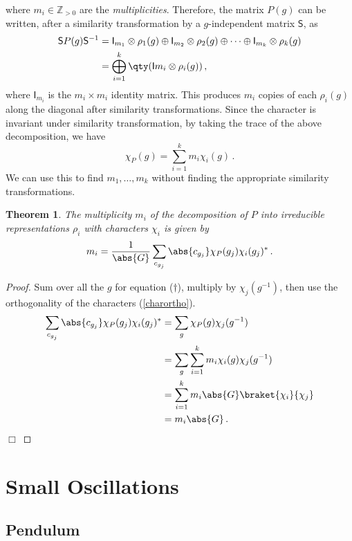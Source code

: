 \documentclass{article}
\theoremstyle{plain}\theoremheaderfont{\normalfont\itshape}\theorembodyfont{\rmfamily}\theoremseparator{.}\newtheorem*{rem}{Remark}\newtheorem*{ex}{Example}\newtheorem*{proof}{Proof}\newtheorem*{altp}{Alternative proof}
\theoremstyle{plain}\theoremheaderfont{\normalfont\bfseries}\theorembodyfont{\rmfamily}\theoremseparator{.}\newtheorem{thm}{Theorem}[section]\newtheorem{lem}[thm]{Lemma}\newtheorem{prop}[thm]{Proposition}\newtheorem*{cor}{Corollary}\newtheorem{defn}[thm]{Definition}\newtheorem{clm}[thm]{Claim}\newtheorem{clminproof}{Claim}
\theoremstyle{break}\theoremheaderfont{\normalfont\itshape}\theorembodyfont{\rmfamily}\theoremseparator{.\medskip}\newtheorem*{proofskip}{Proof}\newtheorem*{exs}{Examples}\newtheorem*{rems}{Remarks}
\theoremstyle{break}\theoremheaderfont{\normalfont\bfseries}\theorembodyfont{\rmfamily}\theoremseparator{.\medskip}\newtheorem{lemskip}[thm]{Lemma}\newtheorem{defnskip}[thm]{Definition}\newtheorem{propskip}[thm]{Proposition}\newtheorem{thmskip}[thm]{Theorem}
\numberwithin{equation}{section}
\newcommand{\qed}{\hfill\ensuremath{\Box}}
\begin{document}
	where \(m_i\in \mathbb{Z}_{>0}\) are the \textit{multiplicities}. Therefore, the matrix \(P(g)\) can be written, after a similarity transformation by a \(g\)-independent matrix \(\mathsf{S}\), as
	\begin{align*}
		\mathsf{S}P(g)\mathsf{S}^{-1}&=\mathsf{I}_{m_1}\otimes\rho_1(g)\oplus\mathsf{I}_{m_2}\otimes\rho_2(g)\oplus\dots\oplus\mathsf{I}_{m_k}\otimes\rho_k(g)\\
		&=\bigoplus_{i=1}^{k}\qty(\mathsf{I}{m_i}\otimes\rho_i(g))\,,
	\end{align*}
	where \(\mathsf{I}_{m_i}\) is the \(m_i\times m_i\) identity matrix. This produces \(m_i\) copies of each \(\rho_i(g)\) along the diagonal after similarity transformations. Since the character is invariant under similarity transformation, by taking the trace of the above decomposition, we have
	\begin{equation}\tag{\(\dagger\)}
		\chi_P(g)=\sum_{i=1}^{k}m_i\chi_i(g)\,.
	\end{equation}
	We can use this to find \(m_1,\dots,m_k\) without finding the appropriate similarity transformations.

	\begin{thm}
		The multiplicity \(m_i\) of the decomposition of \(P\) into irreducible representations \(\rho_i\) with characters \(\chi_i\) is given by
		\[m_i=\frac{1}{\abs{G}}\sum_{c_{g_j}}\abs{c_{g_j}}\chi_P(g_j)\chi_i(g_j)^*\,.\] 
	\end{thm}
	\begin{proof}
		Sum over all the \(g\) for equation (\(\dagger\)), multiply by \(\chi_j(g^{-1})\), then use the orthogonality of the characters (\cref{charortho}).
		\begin{align*}
			\sum_{c_{g_j}}\abs{c_{g_j}}\chi_P(g_j)\chi_i(g_j)^*&=\sum_{g}\chi_P(g)\chi_j(g^{-1})\\
			&=\sum_g\sum_{i=1}^{k}m_i\chi_i(g)\chi_j(g^{-1})\\
			&=\sum_{i=1}^{k}m_i\abs{G}\braket{\chi_i}{\chi_j}\\
			&=m_i\abs{G}\,.
		\end{align*}\qed
	\end{proof}

	\newpage
	
	\section{Small Oscillations}
	\subsection{Pendulum}
\end{document}
